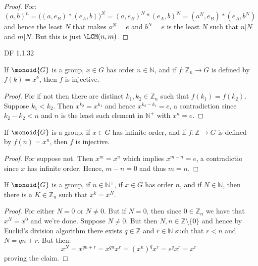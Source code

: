 \documentclass{article}                                                        %
\begin{document}
        \begin{proof}
            For:
            \begin{equation}
                (a,b)^{n}=\big((a,e_{B})*(e_{A},b)\big)^{N}
                =(a,e_{B})^{N}*(e_{A},b)^{N}
                =(a^{N},e_{B})*(e_{A},b^{N})
            \end{equation}
            and hence the least $N$ that makes $a^{N}=e$ and $b^{N}=e$ is the
            least $N$ such that $n|N$ and $m|N$. But this is just $\LCM(n,m)$.
        \end{proof}
        DF 1.1.32
        \begin{theorem}
            If $\monoid{G}$ is a group, $x\in{G}$ has order $n\in\mathbb{N}$,
            and if $f:\mathbb{Z}_{n}\rightarrow{G}$ is defined by
            $f(k)=x^{k}$, then $f$ is injective.
        \end{theorem}
        \begin{proof}
            For if not then there are distinct $k_{1},k_{2}\in\mathbb{Z}_{n}$
            such that $f(k_{1})=f(k_{2})$. Suppose $k_{1}<k_{2}$. Then
            $x^{k_{2}}=x^{k_{1}}$ and hence $x^{k_{2}-k_{1}}=e$, a contradiction
            since $k_{2}-k_{2}<n$ and $n$ is the least such element in
            $\mathbb{N}^{+}$ with $x^{n}=e$.
        \end{proof}
        \begin{theorem}
            If $\monoid{G}$ is a group, if $x\in{G}$ has infinite order, and if
            $f:\mathbb{Z}\rightarrow{G}$ is defined by $f(n)=x^{n}$, then
            $f$ is injective.
        \end{theorem}
        \begin{proof}
            For suppose not. Then $x^{m}=x^{n}$ which implies $x^{m-n}=e$,
            a contradictio since $x$ has infinite order. Hence, $m-n=0$ and thus
            $m=n$.
        \end{proof}
        \begin{theorem}
            If $\monoid{G}$ is a group, if $n\in\mathbb{N}^{+}$, if $x\in{G}$
            has order $n$, and if $N\in\mathbb{N}$, then there is a
            $K\in\mathbb{Z}_{n}$ such that $x^{k}=x^{N}$.
        \end{theorem}
        \begin{proof}
            For either $N=0$ or $N\ne{0}$. But if $N=0$, then since
            $0\in\mathbb{Z}_{n}$ we have that $x^{N}=x^{0}$ and we're done.
            Suppose $N\ne{0}$. But then $N,n\in\mathbb{Z}\setminus\{0\}$ and
            hence by Euclid's division algorithm there exists $q\in\mathbb{Z}$
            and $r\in\mathbb{N}$ such that $r<n$ and $N=qn+r$. But then:
            \begin{equation}
                x^{N}=x^{qn+r}=x^{qn}x^{r}=(x^{n})^{q}x^{r}
                =e^{q}x^{r}=x^{r}
            \end{equation}
            proving the claim.
        \end{proof}
\end{document}
